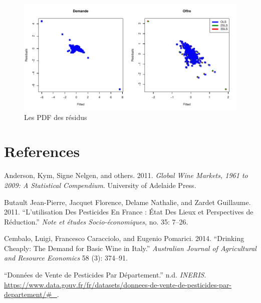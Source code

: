 \documentclass[11pt,]{article}
\begin{document}
\FloatBarrier

\FloatBarrier

\begin{figure}[!htbp]

{\centering \includegraphics{note2pres_files/figure-latex/unnamed-chunk-102-1} 

}

\caption{Les PDF des résidus}\label{fig:unnamed-chunk-102}
\end{figure}

\FloatBarrier

\newpage

\hypertarget{references}{%
\section*{References}\label{references}}

\hypertarget{refs}{}
\leavevmode\hypertarget{ref-anderson2011global}{}%
Anderson, Kym, Signe Nelgen, and others. 2011. \emph{Global Wine
Markets, 1961 to 2009: A Statistical Compendium}. University of Adelaide
Press.

\leavevmode\hypertarget{ref-Butault2011}{}%
Butault Jean-Pierre, Jacquet Florence, Delame Nathalie, and Zardet
Guillaume. 2011. ``L'utilisation Des Pesticides En France : État Des
Lieux et Perspectives de Réduction.'' \emph{Note et études
Socio-économiques}, no. 35: 7--26.

\leavevmode\hypertarget{ref-cembalo2014}{}%
Cembalo, Luigi, Francesco Caracciolo, and Eugenio Pomarici. 2014.
``Drinking Cheaply: The Demand for Basic Wine in Italy.''
\emph{Australian Journal of Agricultural and Resource Economics} 58 (3):
374--91.

\leavevmode\hypertarget{ref-ineris}{}%
``Données de Vente de Pesticides Par Département.'' n.d. \emph{INERIS}.
\url{https://www.data.gouv.fr/fr/datasets/donnees-de-vente-de-pesticides-par-departement/\#_}.
\end{document}
